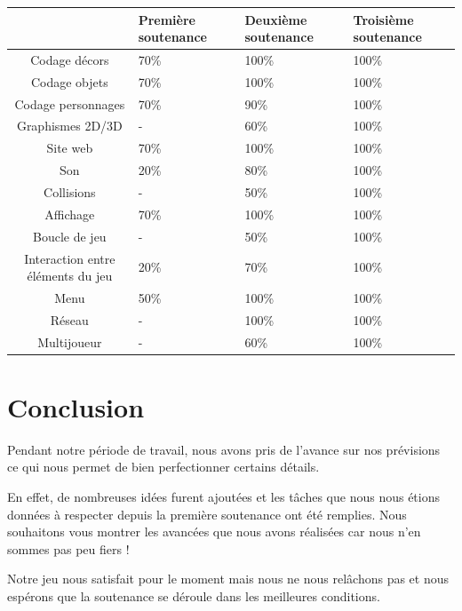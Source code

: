 \documentclass{article}
\begin{document}
\begin{tabular}{|c|p{2cm}|p{2cm}|p{2cm}|}


\hline
& Première soutenance & Deuxième soutenance & Troisième soutenance\\ 
\hline

Codage décors & 70\% & 100\% & 100\%\\
\hline
Codage objets & 70\% & 100\% & 100\%\\
\hline
Codage personnages & 70\% & 90\% & 100\%\\
\hline

Graphismes 2D/3D & - & 60\% & 100\%\\
\hline

Site web & 70\% & 100\% & 100\%\\
\hline

Son & 20\% & 80\% & 100\%\\
\hline

Collisions & - & 50\% & 100\%\\
\hline

Affichage & 70\% & 100\% & 100\%\\
\hline

Boucle de jeu & - & 50\% & 100\%\\
\hline

Interaction entre éléments du jeu & 20\% & 70\% & 100\%\\
\hline

Menu & 50\% & 100\% & 100\%\\
\hline

Réseau & - & 100\% & 100\%\\
\hline

Multijoueur & - & 60\% & 100\%\\
\hline

\end{tabular}

\section{Conclusion}
\par
Pendant notre période de travail, nous avons pris de l’avance sur nos prévisions ce qui nous permet de bien perfectionner certains détails.
\par
En effet, de nombreuses idées furent ajoutées  et les tâches que nous nous étions données à respecter depuis la première soutenance ont été remplies. Nous souhaitons vous montrer les avancées que nous avons réalisées car nous n’en sommes pas peu fiers !
\par
Notre jeu nous satisfait pour le moment mais nous ne nous relâchons pas et nous espérons que la soutenance se déroule dans les meilleures conditions.
\end{document}
